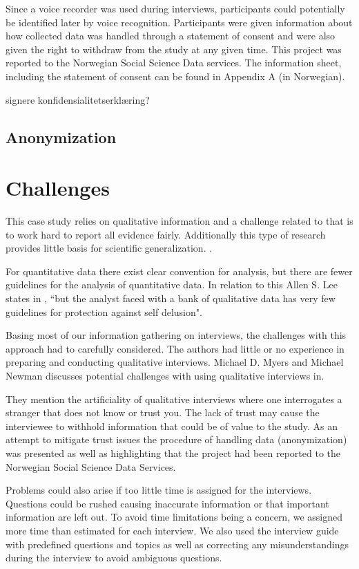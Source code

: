 Since a voice recorder was used during interviews, participants could potentially be identified later by voice recognition. Participants were given information about how collected data was handled through a statement of consent and were also given the right to withdraw from the study at any given time. This project was reported to the Norwegian Social Science Data services. The information sheet, including the statement of consent can be found in Appendix A (in Norwegian).  

signere konfidensialitetserklæring?


\subsection{Anonymization}
\section{Challenges}
This case study relies on qualitative information and a challenge related to that is to work hard to report all evidence fairly. Additionally this type of research provides little basis for scientific generalization. \cite{CaseStudyResearch}.

For quantitative data there exist clear convention for analysis, but there are fewer guidelines for the analysis of quantitative data. In relation to this Allen S. Lee states in \cite{lee1989scientific}, ``but the analyst faced with a bank of qualitative data has very few guidelines for protection against self delusion".

Basing most of our information gathering on interviews, the challenges with this approach had to carefully considered. The authors had little or no experience in preparing and conducting qualitative interviews. Michael D. Myers and Michael Newman discusses potential challenges with using qualitative interviews in\cite{myers2007qualitative}. 

They mention the artificiality of qualitative interviews where one interrogates a stranger that does not know or trust you. The lack of trust may cause the interviewee to withhold information that could be of value to the study. As an attempt to mitigate trust issues the procedure of handling data (anonymization) was presented as well as highlighting that the project had been reported to the Norwegian Social Science Data Services.   

Problems could also arise if too little time is assigned for the interviews. Questions could be rushed causing inaccurate information or that important information are left out. To avoid time limitations being a concern, we assigned more time than estimated for each interview. We also used the interview guide with predefined questions and topics as well as correcting any misunderstandings during the interview to avoid ambiguous questions.

